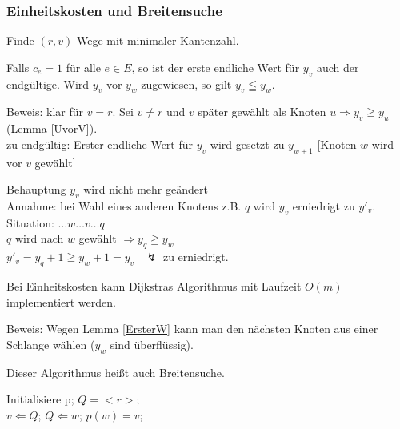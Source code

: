 \subsubsection{Einheitskosten und Breitensuche}

Finde $(r,v)$-Wege mit minimaler Kantenzahl.

\begin{lemma} \label{ErsterW}
Falls $c_{e} = 1$ für alle $e \in E$, so ist der erste endliche Wert für
$y_{v}$ auch der endgültige. Wird $y_{v}$ vor $y_{w}$ zugewiesen, so gilt
$y_{v} \leqq y_{w}$.
\end{lemma}

Beweis: klar für $v=r$. Sei $v \not=r$ und $v$ später gewählt als Knoten
$u \Rightarrow y_{v} \geqq y_{u}$ (Lemma \ref{UvorV}).\\
zu endgültig: Erster endliche Wert für $y_{v}$ wird gesetzt zu $y_{w+1}$
[Knoten $w$ wird vor $v$ gewählt]


Behauptung $y_{v}$ wird nicht mehr geändert \\
Annahme: bei  Wahl eines anderen Knotens z.B. $q$ wird $y_{v}$ erniedrigt
zu $y'_{v}$.\\
Situation: $\ldots w \ldots v \ldots q$\\
$q$ wird nach $w$ gewählt $ \Rightarrow y_{q} \geqq y_{w}$\\
$y'_{v} = y_{q} + 1 \geqq y_{w} + 1 = y_{v} \; \; \; \lightning$ zu
erniedrigt.

\begin{satz}
Bei Einheitskosten kann Dijkstras Algorithmus mit Laufzeit $O(m)$
implementiert werden.
\end{satz}
Beweis: Wegen Lemma \ref{ErsterW} kann man den nächsten Knoten aus einer
Schlange wählen ($y_{w}$ sind überflüssig).

Dieser Algorithmus heißt auch Breitensuche.

\begin{algorithmic}
\STATE Initialisiere p;
\STATE $Q = <r>;$\\
\STATE $v \Leftarrow Q$;
\STATE $Q \Leftarrow w$;
\STATE $p(w) = v$;
\ENDIF
\ENDFOR
\ENDWHILE
\end{algorithmic}



